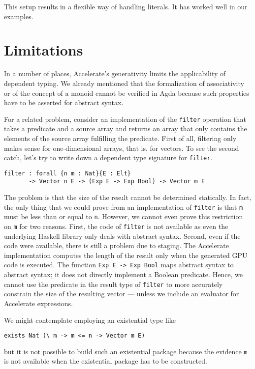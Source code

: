 \documentclass{llncs}
\begin{document}
This setup results in a flexible way of handling literals. It has
worked well in our examples.

\section{Limitations}
\label{sec:limitations}

In a number of places, Accelerate's generativity limits the
applicability of dependent typing. We already mentioned that the
formalization of associativity or of the concept of a monoid cannot be
verified in Agda because such properties have to be asserted for abstract syntax.

For a related problem, consider an implementation of the \texttt{filter}
operation that takes a predicate and a source array and returns an
array that only contains the elements of the source array fulfilling
the predicate.  First of all, filtering only makes sense for
one-dimensional arrays, that is, for vectors. To see the second catch,
let's try to write down a dependent type signature for \texttt{filter}.
\begin{verbatim}
filter : forall {n m : Nat}{E : Elt}
       -> Vector n E -> (Exp E -> Exp Bool) -> Vector m E
\end{verbatim}
The problem is that the size of the result
cannot be determined statically. In fact, the only thing that we could
prove from an implementation of \texttt{filter} is that
\texttt{m} must be less than or equal to \texttt{n}.
However, we cannot even prove this restriction on \texttt{m} for two
reasons. First, the code of \texttt{filter} is not available as even
the underlying Haskell library only deals with abstract
syntax. Second, even if the code were available, there is still a
problem due to staging. The Accelerate implementation computes the length of the result only when the generated GPU code is executed. The function \texttt{Exp E -> Exp Bool} maps abstract syntax to abstract syntax; it does not directly implement a Boolean predicate. Hence, we cannot use the predicate in the result type of \texttt{filter} to more accurately constrain the size of the resulting vector --- unless we include an evaluator for Accelerate expressions. 

We might contemplate employing an existential type like
\begin{verbatim}
exists Nat (\ m -> m <= n -> Vector m E)
\end{verbatim}
but it is not possible to build such an
existential package because the evidence \texttt{m} is not available
when the existential package has to be constructed.
\end{document}
